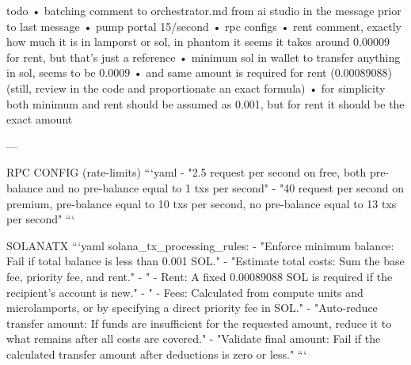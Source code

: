 todo
    • batching comment to orchestrator.md from ai studio in the message prior to last message 
        • pump portal 15/second 
        • rpc configs 
    • rent comment, exactly how much it is in lamporst or sol, in phantom it seems it takes around 0.00009 for rent, but that's just a reference
    • minimum sol in wallet to transfer anything in sol, seems to be 0.0009
        • and same amount is required for rent (0.00089088) (still, review in the code and proportionate an exact formula)
            • for simplicity both minimum and rent should be assumed as 0.001, but for rent it should be the exact amount 



---

RPC CONFIG (rate-limits)
    ```yaml
    - "2.5 request per second on free, both pre-balance and no pre-balance equal to 1 txs per second"
    - "40 request per second on premium, pre-balance equal to 10 txs per second, no pre-balance equal to 13 txs per second"
    ```


SOLANATX
    ```yaml
    solana_tx_processing_rules:
    - "Enforce minimum balance: Fail if total balance is less than 0.001 SOL."
    - "Estimate total costs: Sum the base fee, priority fee, and rent."
    - "  - Rent: A fixed 0.00089088 SOL is required if the recipient's account is new."
    - "  - Fees: Calculated from compute units and microlamports, or by specifying a direct priority fee in SOL."
    - "Auto-reduce transfer amount: If funds are insufficient for the requested amount, reduce it to what remains after all costs are covered."
    - "Validate final amount: Fail if the calculated transfer amount after deductions is zero or less."
    ```